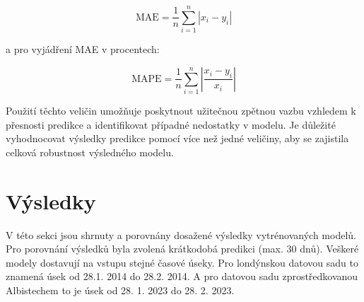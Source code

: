 \documentclass[FM,BP,fonts]{tulthesis}
\begin{document}
\begin{equation}
	\text{MAE} = \frac{1}{n}\sum_{i=1}^{n}|x_i-y_i| 
\end{equation}

a pro vyjádření MAE v procentech: 

\begin{equation}
	\text{MAPE} = \frac{1}{n}\sum_{i=1}^{n}|\frac{x_i-y_i}{x_i}| 
\end{equation}

Použití těchto veličin umožňuje poskytnout užitečnou zpětnou vazbu vzhledem k přesnosti predikce a identifikovat případné nedostatky v modelu. Je důležité vyhodnocovat výsledky predikce pomocí více než jedné veličiny, aby se zajistila celková robustnost výsledného modelu.


\chapter{Výsledky}\label{Výsledky}
V této sekci jsou shrnuty a porovnány dosažené výsledky vytrénovaných modelů. Pro porovnání výsledků byla zvolená krátkodobá predikci (max. 30 dnů). Veškeré modely dostavují na vstupu stejné časové úseky. Pro londýnskou datovou sadu to znamená úsek od 28.1. 2014 do 28.2. 2014. A pro datovou sadu zprostředkovanou Albistechem to je úsek od 28. 1. 2023 do 28. 2. 2023.
\end{document}

